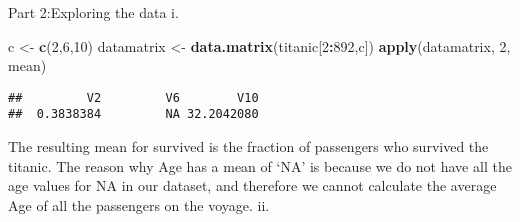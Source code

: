 \documentclass[]{article}
\newenvironment{Shaded}{\begin{snugshade}}{\end{snugshade}}
\newcommand{\KeywordTok}[1]{\textcolor[rgb]{0.13,0.29,0.53}{\textbf{#1}}}
\newcommand{\DecValTok}[1]{\textcolor[rgb]{0.00,0.00,0.81}{#1}}
\newcommand{\StringTok}[1]{\textcolor[rgb]{0.31,0.60,0.02}{#1}}
\newcommand{\CommentTok}[1]{\textcolor[rgb]{0.56,0.35,0.01}{\textit{#1}}}
\newcommand{\ControlFlowTok}[1]{\textcolor[rgb]{0.13,0.29,0.53}{\textbf{#1}}}
\newcommand{\OperatorTok}[1]{\textcolor[rgb]{0.81,0.36,0.00}{\textbf{#1}}}
\newcommand{\NormalTok}[1]{#1}
\begin{document}
\begin{Shaded}
\end{Shaded}

Part 2:Exploring the data i.

\begin{Shaded}
\begin{Highlighting}[]
\NormalTok{c <-}\StringTok{ }\KeywordTok{c}\NormalTok{(}\DecValTok{2}\NormalTok{,}\DecValTok{6}\NormalTok{,}\DecValTok{10}\NormalTok{)}
\NormalTok{datamatrix <-}\StringTok{ }\KeywordTok{data.matrix}\NormalTok{(titanic[}\DecValTok{2}\OperatorTok{:}\DecValTok{892}\NormalTok{,c])}
\KeywordTok{apply}\NormalTok{(datamatrix, }\DecValTok{2}\NormalTok{, mean)}
\end{Highlighting}
\end{Shaded}

\begin{verbatim}
##         V2         V6        V10 
##  0.3838384         NA 32.2042080
\end{verbatim}

The resulting mean for survived is the fraction of passengers who
survived the titanic. The reason why Age has a mean of `NA' is because
we do not have all the age values for NA in our dataset, and therefore
we cannot calculate the average Age of all the passengers on the voyage.
ii.
\end{document}
